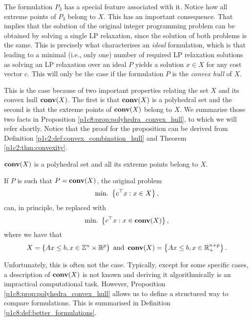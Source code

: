 The formulation $P_3$ has a special feature associated with it. Notice how all extreme points of $P_3$ belong to $X$. This has an important consequence. That implies that the solution of the original integer programming problem can be obtained by solving a single LP relaxation, since the solution of both problems is the same. This is precisely what characterises an \emph{ideal} formulation, which is that leading to a minimal (i.e., only one) number of required LP relaxation solutions as solving an LP relaxation over an ideal $P$ yields a solution $x \in X$ for any cost vector $c$. This will only be the case if the formulation $P$ is the \emph{convex hull} of $X$.

This is the case because of two important properties relating the set $X$ and its convex hull $\mathop{\bf conv}(X)$. The first is that $\mathop{\bf conv}(X)$ is a polyhedral set and the second is that the extreme points of $\mathop{\bf conv}(X)$ belong to $X$. We summarise those two facts in Proposition \ref{p1c8:prop:polyhedra_convex_hull}, to which we will refer shortly. Notice that the proof for the proposition can be derived from Definition \ref{p1c2:def:convex_combination_hull} and Theorem \ref{p1c2:thm:convexity}.
  
\begin{proposition}\label{p1c8:prop:polyhedra_convex_hull}
	$\mathop{\bf conv}(X)$ is a polyhedral set and all its extreme points belong to $X$. 
\end{proposition}

 
If $P$ is such that $P = \mathop{\bf conv} (X)$, the original problem 
%
\begin{equation*}
	\mathop{\text{min.~}}\left\{ c^\top x : x \in X \right \},
\end{equation*}
%
can, in principle, be replaced with 
%
\begin{equation*}
	\mathop{\text{min.~}}\left\{  c^\top x : x \in \mathop{\bf conv}(X) \right \},	
\end{equation*}
%
where we have that 
%
\begin{equation*}
	X = \left\{ Ax \leq b, x \in \mathbb{Z}^n \times \mathbb{R}^p \right \} \text{ and } \mathop{\bf conv}(X) = \left\{ Ax \leq b, x \in \mathbb{R}_+^{n+p} \right \}.	
\end{equation*}

Unfortunately, this is often not the case. Typically, except for some specific cases, a description of $\mathop{\bf conv}(X)$ is not known and deriving it algorithmically is an impractical computational task. However, Proposition \ref{p1c8:prop:polyhedra_convex_hull} allows us to define a structured way to compare formulations. This is summarised in Definition \ref{p1c8:def:better_formulations}.


